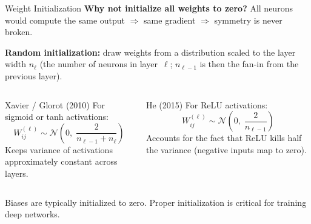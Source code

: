 \documentclass[aspectratio=169,11pt]{beamer}
\begin{document}
\begin{frame}{Weight Initialization}
\textbf{Why not initialize all weights to zero?}
All neurons would compute the same output $\Rightarrow$ same gradient $\Rightarrow$ symmetry is never broken.

\vspace{0.2cm}
\textbf{Random initialization:} draw weights from a distribution scaled to the layer width $n_\ell$ (the number of neurons in layer~$\ell$; $n_{\ell-1}$ is then the fan-in from the previous layer).

\vspace{0.2cm}
\begin{columns}[T]
\begin{block}{Xavier / Glorot (2010)}
For sigmoid or tanh activations:
\[
    W_{ij}^{(\ell)} \sim \mathcal{N}\!\left(0,\; \frac{2}{n_{\ell-1} + n_{\ell}}\right)
\]
Keeps variance of activations approximately constant across layers.
\end{block}

\begin{block}{He (2015)}
For ReLU activations:
\[
    W_{ij}^{(\ell)} \sim \mathcal{N}\!\left(0,\; \frac{2}{n_{\ell-1}}\right)
\]
Accounts for the fact that ReLU kills half the variance (negative inputs map to zero).
\end{block}
\end{columns}

\vspace{0.15cm}
{\small Biases are typically initialized to zero. Proper initialization is critical for training deep networks.}
\end{frame}
\end{document}
